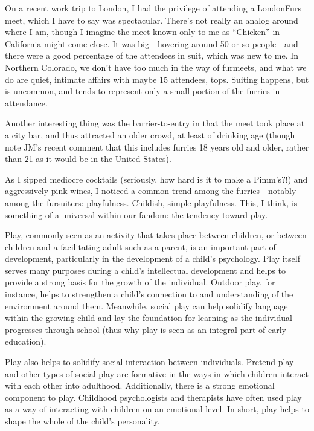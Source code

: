 
On a recent work trip to London, I had the privilege of attending a LondonFurs meet, which I have to say was spectacular. There's not really an analog around where I am, though I imagine the meet known only to me as ``Chicken'' in California might come close. It was big - hovering around 50 or so people - and there were a good percentage of the attendees in suit, which was new to me. In Northern Colorado, we don't have too much in the way of furmeets, and what we do are quiet, intimate affairs with maybe 15 attendees, tops. Suiting happens, but is uncommon, and tends to represent only a small portion of the furries in attendance.

 Another interesting thing was the barrier-to-entry in that the meet took place at a city bar, and thus attracted an older crowd, at least of drinking age (though note JM's recent comment that this includes furries 18 years old and older, rather than 21 as it would be in the United States).

As I sipped mediocre cocktails (seriously, how hard is it to make a Pimm's?!) and aggressively pink wines, I noticed a common trend among the furries - notably among the fursuiters: playfulness. Childish, simple playfulness. This, I think, is something of a universal within our fandom: the tendency toward play.

Play, commonly seen as an activity that takes place between children, or between children and a facilitating adult such as a parent, is an important part of development, particularly in the development of a child's psychology. Play itself serves many purposes during a child's intellectual development and helps to provide a strong basis for the growth of the individual. Outdoor play, for instance, helps to strengthen a child's connection to and understanding of the environment around them. Meanwhile, social play can help solidify language within the growing child and lay the foundation for learning as the individual progresses through school (thus why play is seen as an integral part of early education).

Play also helps to solidify social interaction between individuals. Pretend play and other types of social play are formative in the ways in which children interact with each other into adulthood. Additionally, there is a strong emotional component to play. Childhood psychologists and therapists have often used play as a way of interacting with children on an emotional level. In short, play helps to shape the whole of the child's personality.

